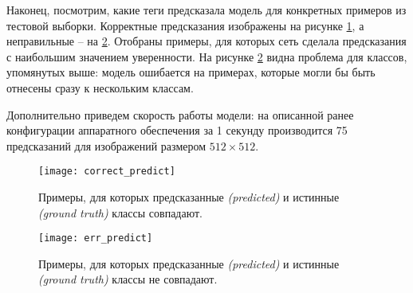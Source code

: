 \indent
\indent
Наконец, посмотрим, какие теги предсказала модель для конкретных
примеров из тестовой выборки. Корректные предсказания изображены
на рисунке \ref{tikzpicture: correct_predict}, а неправильные -- на
\ref{tikzpicture: err_predict}. Отобраны примеры, для которых сеть сделала
предсказания с наибольшим значением уверенности.
На рисунке \ref{tikzpicture: err_predict} видна
проблема для классов, упомянутых выше: модель ошибается на примерах, 
которые могли бы быть отнесены сразу к нескольким классам.


\indent
\indent
Дополнительно приведем скорость работы модели: на описанной ранее
конфигурации аппаратного обеспечения за 1 секунду производится
75 предсказаний для изображений размером $512 \times 512$.



\begin{figure}
    \begin{center}
   	    \texttt{[image: correct\_predict]}
   	\end{center}
   	\caption{Примеры, для которых предсказанные
   	 \textit{(predicted)} и истинные \textit{(ground truth)} классы совпадают.}
   	\label{tikzpicture: correct_predict}
\end{figure}


\begin{figure}
    \begin{center}
   	    \texttt{[image: err\_predict]}
   	\end{center}
   	\caption{Примеры, для которых предсказанные
   	 \textit{(predicted)} и истинные \textit{(ground truth)} классы не совпадают.}
   	\label{tikzpicture: err_predict}
\end{figure}
